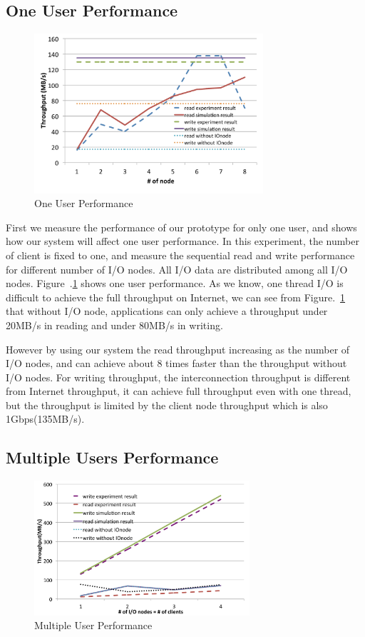 \subsection{One User Performance}

\begin{figure}
\centering
\includegraphics[width=8.5cm]{img/one_client.pdf}
\caption{One User Performance}
\label{evaluation:one user performance}
\end{figure}

First we measure the performance of our prototype for only one user, and shows how our system
will affect one user performance.
In this experiment, the number of client is fixed to one, and measure
the sequential read and write performance for different number of I/O nodes.
All I/O data are distributed among all I/O nodes.
Figure~.\ref{evaluation:one user performance} shows one user performance.
As we know, one thread I/O is difficult to achieve the full throughput on Internet, we can see from
Figure.~\ref{evaluation:one user performance} that without I/O node, applications can only achieve a
throughput under 20MB/s in reading and under 80MB/s in writing.

However by using our system the read throughput increasing as the number of I/O nodes, and can
achieve about 8 times faster than the throughput without I/O nodes.
For writing throughput, the interconnection throughput is different from Internet throughput, it can
achieve full throughput even with one thread, but the throughput is limited by the client node
throughput which is also 1Gbps(135MB/s).

\subsection{Multiple Users Performance}

\begin{figure}
\centering
\includegraphics[width=8cm]{img/multiple_client.pdf}
\caption{Multiple User Performance}
\label{evaluation:multiple user performance}
\end{figure}

